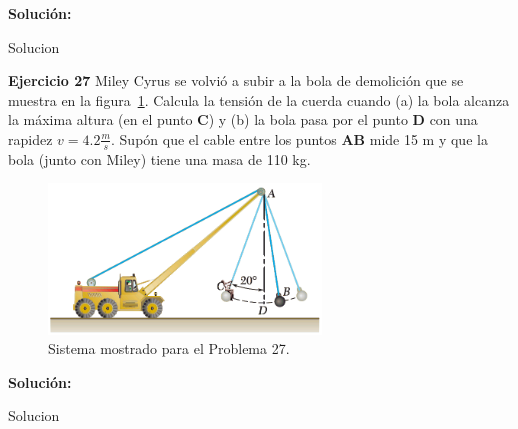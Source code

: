 \documentclass[a4paper,11pt]{scrartcl}
\begin{document}
\textbf{Solución:}

\begin{center}

Solucion

\end{center}

\textbf{Ejercicio 27} Miley Cyrus se volvió a subir a la bola de demolición que se muestra en la figura~\ref{fig:27_1}. Calcula la tensión de la cuerda cuando (a) la bola alcanza la máxima altura (en el punto \textbf{C}) y (b) la bola pasa por el punto \textbf{D} con una rapidez $ v = 4.2 \frac{m}{s}$. Supón que el cable entre los puntos \textbf{AB} mide 15
m y que la bola (junto con Miley) tiene una masa de 110 kg. \\

\begin{figure}[H]
  \centering
  \includegraphics[height=4cm]{27_1}
  \caption{Sistema mostrado para el Problema 27.}
  \label{fig:27_1}
\end{figure}

\textbf{Solución:}

\begin{center}

Solucion

\end{center}
\end{document}
